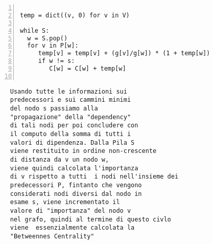 \begin{minipage}{0.49\linewidth}
	\begin{Verbatim}[frame=topline,numbers=left,label=Codice,framesep=3mm]
	
temp = dict((v, 0) for v in V)
	
while S:
  w = S.pop()
  for v in P[w]:
     temp[v] = temp[v] + (g[v]/g[w]) * (1 + temp[w])
     if w != s:
        C[w] = C[w] + temp[w]
        
	\end{Verbatim}
\end{minipage}\hfill
\begin{minipage}{0.49\linewidth}
	\begin{Verbatim}
	 Usando tutte le informazioni sui 
	 predecessori e sui cammini minimi 
	 del nodo s passiamo alla 
	 "propagazione" della "dependency" 
	 di tali nodi per poi concludere con 
	 il computo della somma di tutti i 
	 valori di dipendenza. Dalla Pila S 
	 viene restituito in ordine non-crescente
	 di distanza da v un nodo w, 
	 viene quindi calcolata l'importanza
	 di v rispetto a tutti  i nodi nell'insieme dei
	 predecessori P, fintanto che vengono 
	 considerati nodi diversi dal nodo in
	 esame s, viene incrementato il 
	 valore di "importanza" del nodo v 
	 nel grafo, quindi al termine di questo civlo
	 viene  essenzialmente calcolata la
	 "Betweennes Centrality"
	\end{Verbatim}
\end{minipage}
 \newline\newline